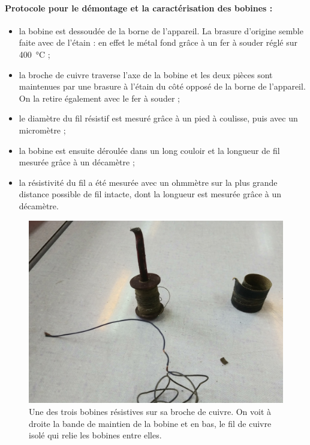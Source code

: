 \documentclass[12pt,a4paper,fleqn]{article}
\begin{document}
\paragraph{Protocole pour le démontage et la caractérisation des bobines :}
\begin{itemize}
\item la bobine est dessoudée de la borne de l'appareil.
La brasure d'origine semble faite avec de l'étain : en effet le métal fond grâce à un fer à souder réglé sur \qty{400}{\degreeCelsius} ;
\item la broche de cuivre traverse l'axe de la bobine et les deux pièces sont maintenues par une brasure à l'étain du côté opposé de la borne de l'appareil.
On la retire également avec le fer à souder ;
\item le diamètre du fil résistif est mesuré grâce à un pied à coulisse, puis avec un micromètre ;
\item la bobine est ensuite déroulée dans un long couloir et la longueur de fil mesurée grâce à un décamètre ;
\item la résistivité du fil a été mesurée avec un ohmmètre sur la plus grande distance possible de fil intacte, dont la longueur est mesurée grâce à un décamètre.
\end{itemize}

\begin{figure}[htbp]
    \center
    \includegraphics[height=300 pt]{images/20210311_150656.jpg}
    \caption{Une des trois bobines résistives sur sa broche de cuivre.
    On voit à droite la bande de maintien de la bobine et en bas, le fil de cuivre isolé qui relie les bobines entre elles.}
    \label{fig:bobine}
\end{figure}
\end{document}
